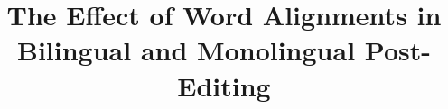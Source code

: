 
\title{The Effect of Word Alignments in Bilingual and Monolingual Post-Editing}

\author{%
        {}\\
	    {}\\
	    {}\\
	    {}\\
	    {\tt}
}

\date{}
